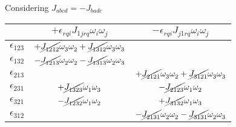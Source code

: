 Considering $J_{abcd}= -J_{badc}$
\begin{table}[H]
\centering
 \begin{tabular}{||c | | c  | c||} 
 \hline
  & $+\epsilon_{rqi}J^{}_{1jrq}\omega^{}_{i}\omega^{}_{j}$ & $-\epsilon_{rqi}J^{}_{j1rq}\omega^{}_{i}\omega^{}_{j}   $\\ [1.5ex] 
 \hline\hline
 $\epsilon_{123}$ & $+\cancel{J^{}_{1212}}\omega^{}_{3}\omega^{}_{2}+\cancel{J^{}_{1312}}\omega^{}_{3}\omega^{}_{3}$ & $ $\\  
 $\epsilon_{132}$ & $-\cancel{J^{}_{1213}}\omega^{}_{2}\omega^{}_{2}-\cancel{J^{}_{1313}}\omega^{}_{2}\omega^{}_{3}$ & $ $\\
 $\epsilon_{213}$ & $ $ & $+\cancel{J^{}_{2121}}\omega^{}_{3}\omega^{}_{2}+\cancel{J^{}_{3121}}\omega^{}_{3}\omega^{}_{3}   $\\
 $\epsilon_{231}$ & $+\cancel{J^{}_{1323}}\omega^{}_{1}\omega^{}_{3}$ & $-\cancel{J^{}_{2123}}\omega^{}_{1}\omega^{}_{2}$\\
 $\epsilon_{321}$ & $-\cancel{J^{}_{1232}}\omega^{}_{1}\omega^{}_{2}$ & $+\cancel{J^{}_{3132}}\omega^{}_{1}\omega^{}_{3}   $\\
 $\epsilon_{312}$ & $ $ & $-\cancel{J^{}_{2131}}\omega^{}_{2}\omega^{}_{2} -\cancel{J^{}_{3131}}\omega^{}_{2}\omega^{}_{3}   $\\   [1ex] 
 \hline
 \end{tabular}
\end{table}

